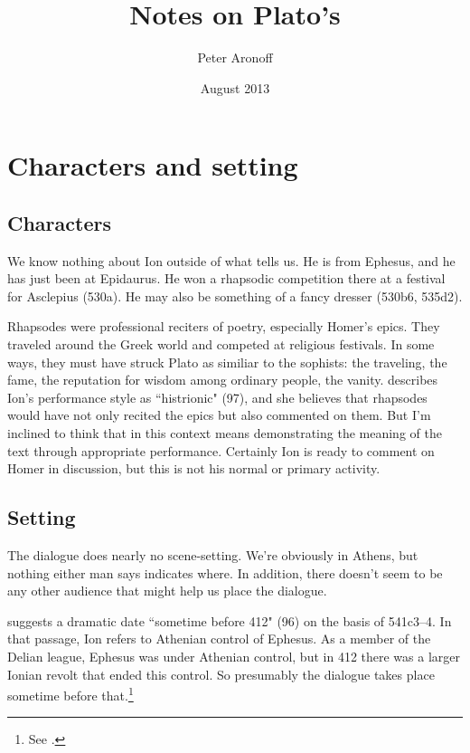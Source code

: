 \documentclass[11pt]{article}
\begin{document}
\begin{titlepage}
\title{Notes on Plato's }
\author{Peter Aronoff}
\date{August 2013}
\maketitle
\end{titlepage}

\section{Characters and setting}

\subsection{Characters}

We know nothing about Ion outside of what  tells us.  He is from
Ephesus, and he has just been at Epidaurus.  He won a rhapsodic competition
there at a festival for Asclepius (530a).  He may also be something of
a fancy dresser (530b6, 535d2).

Rhapsodes were professional reciters of poetry, especially Homer's epics.
They traveled around the Greek world and competed at religious festivals.
In some ways, they must have struck Plato as similiar to the sophists: the
traveling, the fame, the reputation for wisdom among ordinary people, the
vanity.  \citet{murray1996} describes Ion's performance style as
``histrionic" (97), and she believes that rhapsodes would have not only
recited the epics but also commented on them.  But I'm inclined to think
that in this context  means demonstrating the meaning
of the text through appropriate performance. Certainly Ion is ready to
comment on Homer in discussion, but this is not his normal or primary
activity.


\subsection{Setting}

The dialogue does nearly no scene-setting.  We're obviously in Athens, but
nothing either man says indicates where.  In addition, there doesn't seem
to be any other audience that might help us place the dialogue.

\citet{murray1996} suggests a dramatic date ``sometime before 412" (96) on
the basis of 541c3--4.  In that passage, Ion refers to Athenian control of
Ephesus.  As a member of the Delian league, Ephesus was under Athenian
control, but in 412 there was a larger Ionian revolt that ended this
control.  So presumably the dialogue takes place sometime before
that.\footnote{See \citet{moore1974}.}
\end{document}
